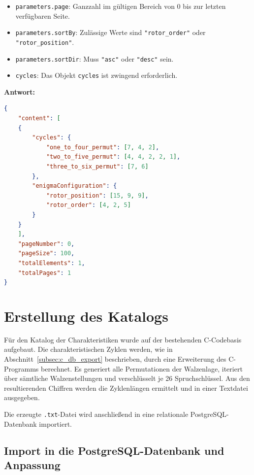 \documentclass[12pt, ngerman, a4paper, numbers=noenddot]{article}
\begin{document}
\begin{itemize}
	\item \lstinline|parameters.page|: Ganzzahl im gültigen Bereich von 0 bis zur letzten verfügbaren Seite.
	\item \lstinline|parameters.sortBy|: Zulässige Werte sind \lstinline|"rotor_order"| oder \newline\lstinline|"rotor_position"|.
	\item \lstinline|parameters.sortDir|: Muss \lstinline|"asc"| oder \lstinline|"desc"| sein.
	\item \lstinline|cycles|: Das Objekt \lstinline|cycles| ist zwingend erforderlich.
\end{itemize}
\newpage
\textbf{Antwort:}
\begin{lstlisting}[language=json, caption={Antwort auf /catalogue-Anfrage}]
{
	"content": [
	{
		"cycles": {
			"one_to_four_permut": [7, 4, 2],
			"two_to_five_permut": [4, 4, 2, 2, 1],
			"three_to_six_permut": [7, 6]
		},
		"enigmaConfiguration": {
			"rotor_position": [15, 9, 9],
			"rotor_order": [4, 2, 5]
		}
	}
	],
	"pageNumber": 0,
	"pageSize": 100,
	"totalElements": 1,
	"totalPages": 1
}
\end{lstlisting}







\section{Erstellung des Katalogs}
\label{sec:db_erstellung}

Für den Katalog der Charakteristiken wurde auf der bestehenden C-Codebasis aufgebaut. Die charakteristischen Zyklen werden, wie in Abschnitt~\ref{subsec:c_db_export} beschrieben, durch eine Erweiterung des C-Programms berechnet. Es generiert alle Permutationen der Walzenlage, iteriert über sämtliche Walzenstellungen und verschlüsselt je 26 Spruchschlüssel. Aus den resultierenden Chiffren werden die Zyklenlängen ermittelt und in einer Textdatei ausgegeben.
  
Die erzeugte \lstinline|.txt|-Datei wird anschließend in eine relationale PostgreSQL-Datenbank importiert.




\subsection{Import in die PostgreSQL-Datenbank und Anpassung}
\end{document}
